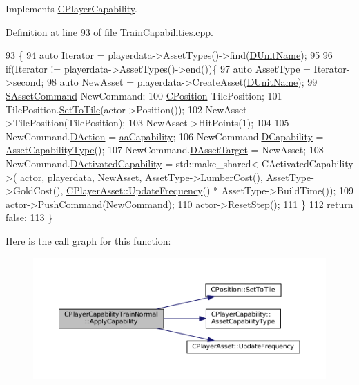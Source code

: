Implements \hyperlink{classCPlayerCapability_a2ca6fd7fbd9c0178f1cf1d049c63825f}{C\+Player\+Capability}.



Definition at line 93 of file Train\+Capabilities.\+cpp.


\begin{DoxyCode}
93                                                                                                            
                                                               \{
94     \textcolor{keyword}{auto} Iterator = playerdata->AssetTypes()->find(\hyperlink{classCPlayerCapabilityTrainNormal_aed40686355e78c151910e23ea2d9d32c}{DUnitName});
95     
96     \textcolor{keywordflow}{if}(Iterator != playerdata->AssetTypes()->end())\{
97         \textcolor{keyword}{auto} AssetType = Iterator->second;
98         \textcolor{keyword}{auto} NewAsset = playerdata->CreateAsset(\hyperlink{classCPlayerCapabilityTrainNormal_aed40686355e78c151910e23ea2d9d32c}{DUnitName});
99         \hyperlink{structSAssetCommand}{SAssetCommand} NewCommand;
100         \hyperlink{classCPosition}{CPosition} TilePosition;
101         TilePosition.\hyperlink{classCPosition_ae302aa21792de64c97de29e2cbbfeb94}{SetToTile}(actor->Position());
102         NewAsset->TilePosition(TilePosition);
103         NewAsset->HitPoints(1);
104         
105         NewCommand.\hyperlink{structSAssetCommand_a8edd3b3d59a76d5514ba403bc8076a75}{DAction} = \hyperlink{GameDataTypes_8h_ab47668e651a3032cfb9c40ea2d60d670acf9fb164e8abd71c71f4a8c7fda360d4}{aaCapability};
106         NewCommand.\hyperlink{structSAssetCommand_a734ea7c6847457b437360f333f570ff9}{DCapability} = \hyperlink{classCPlayerCapability_a433bb196cd6ab6a932f1cac102b3aa98}{AssetCapabilityType}();
107         NewCommand.\hyperlink{structSAssetCommand_a3d9b43f6e59c386c48c41a65448a0c39}{DAssetTarget} = NewAsset;
108         NewCommand.\hyperlink{structSAssetCommand_ad8beda19520811cc70fe1eab16c774dd}{DActivatedCapability} = std::make\_shared< CActivatedCapability >(
      actor, playerdata, NewAsset, AssetType->LumberCost(), AssetType->GoldCost(), 
      \hyperlink{classCPlayerAsset_a0aff85b9552967a42f4f3f42cb59c19f}{CPlayerAsset::UpdateFrequency}() * AssetType->BuildTime());
109         actor->PushCommand(NewCommand);
110         actor->ResetStep();
111     \}
112     \textcolor{keywordflow}{return} \textcolor{keyword}{false};
113 \}
\end{DoxyCode}
Here is the call graph for this function\+:\nopagebreak
\begin{figure}[H]
\begin{center}
\leavevmode
\includegraphics[width=350pt]{classCPlayerCapabilityTrainNormal_a04ed166d2072d44ddc96735ac1beb9bc_cgraph}
\end{center}
\end{figure}
